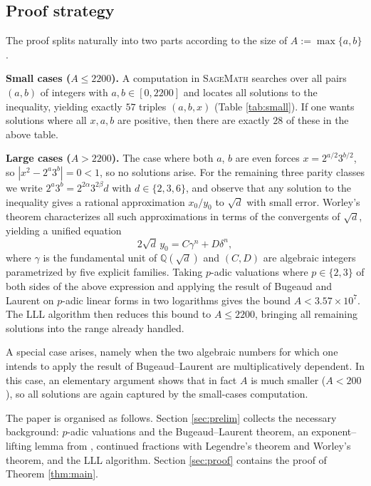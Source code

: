 \documentclass[11pt,a4paper]{article}
\numberwithin{equation}{section}
\numberwithin{table}{section}
\numberwithin{figure}{section}
\begin{document}
\subsection{Proof strategy}

The proof splits naturally into two parts according to the size of $A := \max\{a,b\}$.

\medskip

\noindent\textbf{Small cases ($A \leq 2200$).} A computation in \textsc{SageMath} searches over all pairs $(a,b)$ of integers with $a,b \in [0,2200]$ and locates all solutions to
the inequality, yielding exactly $57$ triples $(a,b,x)$
(Table \ref{tab:small}). If one wants solutions where all $x,a,b$ are positive, then there are exactly $28$ of these in the above table. 

\medskip
\noindent\textbf{Large cases ($A > 2200$).}
The case where both $a$, $b$ are even forces $x = 2^{a/2}3^{b/2}$, so $|x^2 - 2^a 3^b| = 0 < 1$, so no solutions arise. For the remaining three parity classes we write $2^a 3^b = 2^{2\alpha}3^{2\beta}d$ with $d \in \{2,3,6\}$, and observe that any solution to the inequality gives a rational approximation $x_0/y_0$ to ${\sqrt{d}}$ with small error. Worley's theorem \cite{Worley1981} characterizes all such approximations in terms of the convergents of $\sqrt{d}$, yielding a unified equation
\begin{equation*}
	2\sqrt{d}\,y_0 = C\gamma^n + D\delta^n,
\end{equation*}
where $\gamma$ is the fundamental unit of $\mathbb{Q}(\sqrt{d})$ and $(C,D)$ are algebraic integers parametrized by five explicit families. Taking $p$-adic valuations
where $p\in \{2,3\}$ of both sides of the above expression and applying the result of Bugeaud and
Laurent \cite{BL} on $p$-adic linear forms in two logarithms gives the bound $A < 3.57 \times 10^7$. The LLL algorithm then
reduces this bound to $A \leq 2200$, bringing all remaining solutions into the range already handled.

A special  case arises, namely when the two algebraic numbers for which one intends to apply the result of Bugeaud--Laurent are multiplicatively dependent.
In this case, an elementary argument shows that in fact $A$ is much smaller ($A < 200$), so all solutions are again captured by the small-cases computation.

\medskip

The paper is organised as follows. Section \ref{sec:prelim} collects the necessary background: $p$-adic valuations and the Bugeaud--Laurent theorem, an exponent--lifting lemma from \cite{post}, continued fractions with Legendre's theorem and Worley's
theorem, and the LLL algorithm. Section \ref{sec:proof} contains the proof of Theorem \ref{thm:main}.
\end{document}
